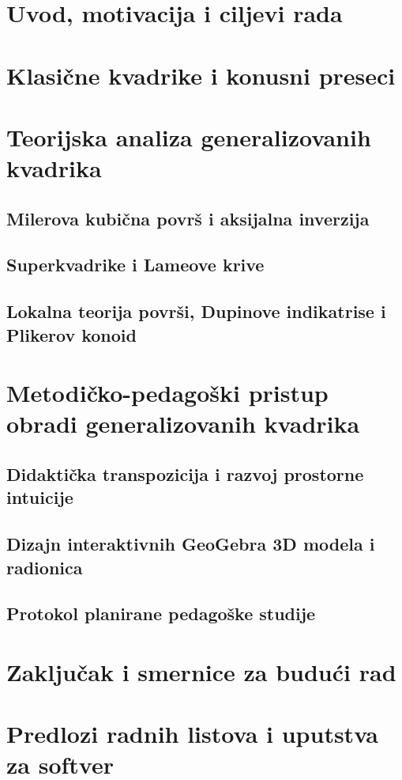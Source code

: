 \documentclass[12pt,oneside]{memoir}
\begin{document}
\frontmatter
\naslovna
\komisija
\apstrakt
\tableofcontents*

\mainmatter
\chapter{Uvod, motivacija i ciljevi rada}

\chapter{Klasične kvadrike i konusni preseci}

\chapter{Teorijska analiza generalizovanih kvadrika}
\section{Milerova kubična površ i aksijalna inverzija}
\section{Superkvadrike i Lameove krive}
\section{Lokalna teorija površi, Dupinove indikatrise i Plikerov konoid}

\chapter{Metodičko-pedagoški pristup obradi generalizovanih kvadrika}
\section{Didaktička transpozicija i razvoj prostorne intuicije}
\section{Dizajn interaktivnih GeoGebra 3D modela i radionica}
\section{Protokol planirane pedagoške studije}

\chapter{Zaključak i smernice za budući rad}

\appendix
\chapter{Predlozi radnih listova i uputstva za softver}

\backmatter
\literatura
\begin{biografija}
\end{biografija}
\end{document}
